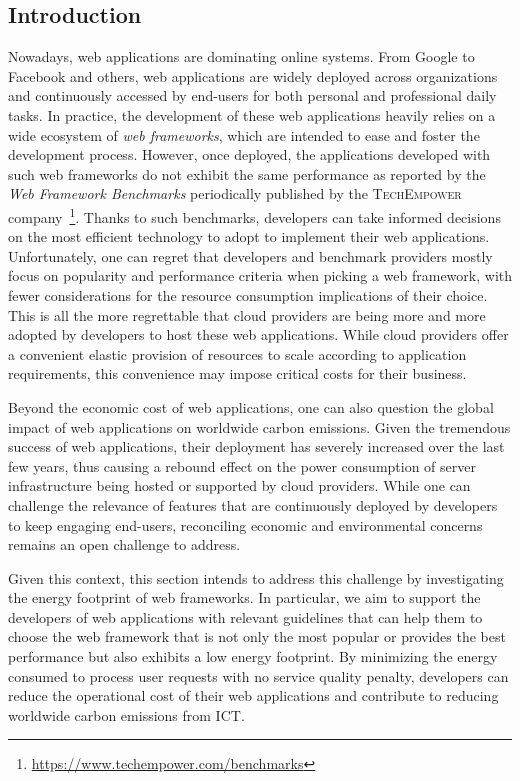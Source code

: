 \subsection{Introduction}
Nowadays, web applications are dominating online systems.
From Google to Facebook and others, web applications are widely deployed across organizations and continuously accessed by end-users for both personal and professional daily tasks.
In practice, the development of these web applications heavily relies on a wide ecosystem of \emph{web frameworks}, which are intended to ease and foster the development process.
However, once deployed, the applications developed with such web frameworks do not exhibit the same performance as reported by the \emph{Web Framework Benchmarks} periodically published by the \textsc{TechEmpower} company~\footnote{\url{https://www.techempower.com/benchmarks}}.
Thanks to such benchmarks, developers can take informed decisions on the most efficient technology to adopt to implement their web applications.
Unfortunately, one can regret that developers and benchmark providers mostly focus on popularity and performance criteria when picking a web framework, with fewer considerations for the resource consumption implications of their choice.
This is all the more regrettable that cloud providers are being more and more adopted by developers to host these web applications.
While cloud providers offer a convenient elastic provision of resources to scale according to application requirements, this convenience may impose critical costs for their business.

Beyond the economic cost of web applications, one can also question the global impact of web applications on worldwide carbon emissions.
Given the tremendous success of web applications, their deployment has severely increased over the last few years, thus causing a rebound effect on the power consumption of server infrastructure being hosted or supported by cloud providers.
While one can challenge the relevance of features that are continuously deployed by developers to keep engaging end-users, reconciling economic and environmental concerns remains an open challenge to address.


Given this context, this section intends to address this challenge by investigating the energy footprint of web frameworks.
In particular, we aim to support the developers of web applications with relevant guidelines that can help them to choose the web framework that is not only the most popular or provides the best performance but also exhibits a low energy footprint.
By minimizing the energy consumed to process user requests with no service quality penalty, developers can reduce the operational cost of their web applications and contribute to reducing worldwide carbon emissions from ICT.

